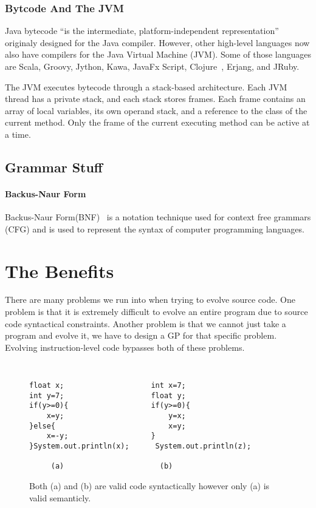 \documentclass{sig-alternate}
\begin{document}
\subsubsection{ Bytcode And The JVM}
Java bytecode ``is the intermediate, platform-independent representation''~\cite{VIII:2011} originaly designed for the Java compiler. However, other high-level languages now also have compilers for the Java Virtual Machine (JVM). Some of those languages are Scala, Groovy, Jython, Kawa, JavaFx Script, Clojure~\cite{FINCH:2011}, Erjang, and JRuby. 

The JVM executes bytecode through a stack-based architecture. Each JVM thread has a private stack, and each stack stores frames. Each frame contains an array of local variables, its own operand stack, and a reference to the class of the current method. Only the frame of the current executing method can be active at a time.


\subsection{Grammar Stuff}

\paragraph{Backus-Naur Form}
	Backus-Naur Form(BNF)~\cite{BNF:2014} is a notation technique used for context free grammars (CFG) and is used to represent the syntax of computer programming languages.





\section{The Benefits}

There are many problems we run into when trying to evolve source code. One problem is that it is extremely difficult to evolve an entire program due to source code syntactical constraints. Another problem is that we cannot just take a program and evolve it, we have to design  a GP for that specific problem. Evolving instruction-level code bypasses both of these problems.

\begin{figure}
\centering
{\tt
\begin{verbatim}
float x;                    int x=7;
int y=7;                    float y;
if(y>=0){                   if(y>=0){
    x=y;                        y=x;
}else{                          x=y;
    x=-y;                   }
}System.out.println(x);      System.out.println(z);	
     
     (a)                      (b)

\end{verbatim}
}
\caption{Both (a) and (b) are valid code syntactically however only (a) is valid semanticly.}
\end{figure}
\end{document}
